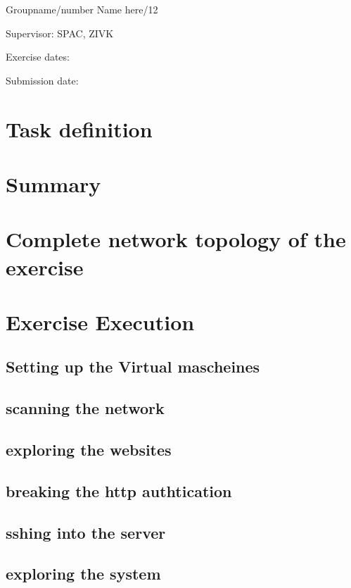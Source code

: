 \documentclass[a4paper]{article}
\begin{document}
Groupname/number Name here/12

Supervisor: 	SPAC, ZIVK

Exercise dates:	

Submission date:


\newpage
\tableofcontents

\newpage

\section{Task definition}



\section{Summary}

\newpage

\section{Complete network topology of the exercise}

\newpage

\section{Exercise Execution}
\subsection{Setting up the Virtual mascheines}

\subsection{scanning the network}
\subsection{exploring the websites}
\subsection{breaking the http authtication}
\subsection{sshing into the server}
\subsection{exploring the system}
\end{document}
